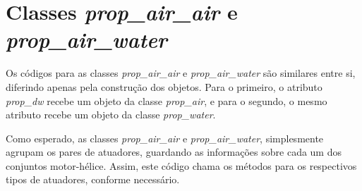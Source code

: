 


\section{Classes \emph{prop\_air\_air} e \emph{prop\_air\_water}}
Os códigos para as classes \emph{prop\_air\_air} e \emph{prop\_air\_water} são similares entre si, diferindo apenas pela construção dos objetos. Para o primeiro, o atributo \emph{prop\_dw} recebe um objeto da classe \emph{prop\_air}, e para o segundo, o mesmo atributo recebe um objeto da classe \emph{prop\_water}.

Como esperado, as classes \emph{prop\_air\_air} e \emph{prop\_air\_water}, simplesmente agrupam os pares de atuadores, guardando as informações sobre cada um dos conjuntos motor-hélice. Assim, este código chama os métodos para os respectivos tipos de atuadores, conforme necessário.